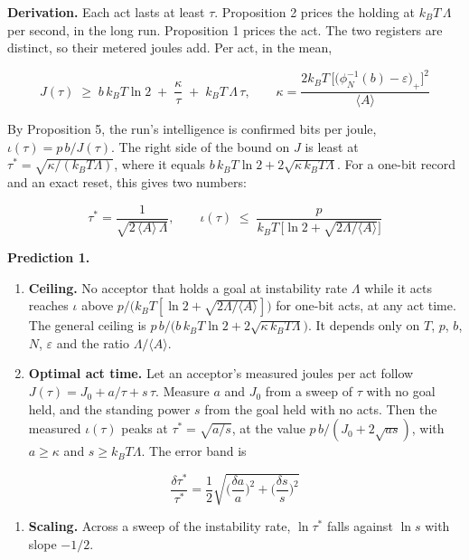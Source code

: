 \documentclass[
  10pt,
]{article}
\providecommand{\tightlist}{%
  \setlength{\itemsep}{0pt}\setlength{\parskip}{0pt}}
\begin{document}
\textbf{Derivation.} Each act lasts at least \(\tau\). Proposition 2
prices the holding at \(k_B T\,\Lambda\) per second, in the long run.
Proposition 1 prices the act. The two registers are distinct, so their
metered joules add. Per act, in the mean,

\[J(\tau) \;\ge\; b\,k_B T\ln 2 \;+\; \frac{\kappa}{\tau} \;+\; k_B T\,\Lambda\,\tau, \qquad \kappa = \frac{2k_B T\,\big[\big(\phi_N^{-1}(b) - \varepsilon\big)_+\big]^2}{\langle A\rangle}\]

By Proposition 5, the run's intelligence is confirmed bits per joule,
\(\iota(\tau) = p\,b/J(\tau)\). The right side of the bound on \(J\) is
least at \(\tau^* = \sqrt{\kappa/(k_B T\Lambda)}\), where it equals
\(b\,k_B T\ln 2 + 2\sqrt{\kappa\,k_B T\Lambda}\). For a one-bit record
and an exact reset, this gives two numbers:

\[\tau^* = \frac{1}{\sqrt{2\,\langle A\rangle\,\Lambda}}, \qquad \iota(\tau) \;\le\; \frac{p}{k_B T\,\big[\ln 2 + \sqrt{2\Lambda/\langle A\rangle}\big]}\]

\textbf{Prediction 1.}

\begin{enumerate}
\def\labelenumi{\arabic{enumi}.}
\tightlist
\item
  \textbf{Ceiling.} No acceptor that holds a goal at instability rate
  \(\Lambda\) while it acts reaches \(\iota\) above
  \(p/\big(k_B T[\ln 2 + \sqrt{2\Lambda/\langle A\rangle}]\big)\) for
  one-bit acts, at any act time. The general ceiling is
  \(p\,b/\big(b\,k_B T\ln 2 + 2\sqrt{\kappa\,k_B T\Lambda}\big)\). It
  depends only on \(T\), \(p\), \(b\), \(N\), \(\varepsilon\) and the
  ratio \(\Lambda/\langle A\rangle\).
\item
  \textbf{Optimal act time.} Let an acceptor's measured joules per act
  follow \(J(\tau) = J_0 + a/\tau + s\,\tau\). Measure \(a\) and \(J_0\)
  from a sweep of \(\tau\) with no goal held, and the standing power
  \(s\) from the goal held with no acts. Then the measured
  \(\iota(\tau)\) peaks at \(\tau^* = \sqrt{a/s}\), at the value
  \(p\,b/(J_0 + 2\sqrt{a s})\), with \(a \ge \kappa\) and
  \(s \ge k_B T\Lambda\). The error band is
\end{enumerate}

\[\frac{\delta\tau^*}{\tau^*} = \frac{1}{2}\sqrt{\Big(\frac{\delta a}{a}\Big)^2 + \Big(\frac{\delta s}{s}\Big)^2}\]

\begin{enumerate}
\def\labelenumi{\arabic{enumi}.}
\setcounter{enumi}{2}
\tightlist
\item
  \textbf{Scaling.} Across a sweep of the instability rate,
  \(\ln\tau^*\) falls against \(\ln s\) with slope \(-1/2\).
\end{enumerate}
\end{document}
